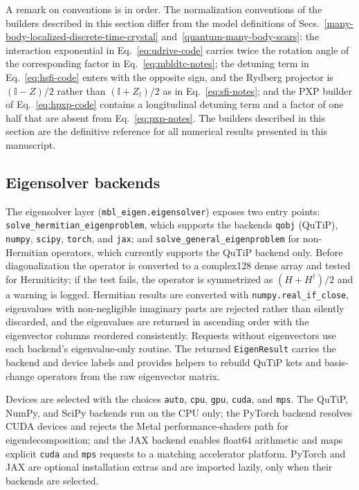 \documentclass[longbibliography]{revtex4-2}
\begin{document}
A remark on conventions is in order. The normalization conventions of
the builders described in this section differ from the model definitions
of Secs.~\ref{many-body-localized-discrete-time-crystal}
and~\ref{quantum-many-body-scars}: the interaction exponential in
Eq.~\eqref{eq:udrive-code} carries twice the rotation angle of the
corresponding factor in Eq.~\eqref{eq:mbldtc-notes}; the detuning term
in Eq.~\eqref{eq:hsfi-code} enters with the opposite sign, and the
Rydberg projector is $(\mathbb{I} - Z)/2$ rather than
$(\mathbb{I} + Z_l)/2$ as in Eq.~\eqref{eq:sfi-notes}; and the PXP
builder of Eq.~\eqref{eq:hpxp-code} contains a longitudinal detuning
term and a factor of one half that are absent from
Eq.~\eqref{eq:pxp-notes}. The builders described in this section are the
definitive reference for all numerical results presented in this
manuscript.

\subsection{Eigensolver backends}\label{subsec:eigensolver}

The eigensolver layer (\texttt{mbl\_eigen.eigensolver}) exposes two
entry points: \texttt{solve\_hermitian\_eigenproblem}, which supports
the backends \texttt{qobj} (QuTiP), \texttt{numpy}, \texttt{scipy},
\texttt{torch}, and \texttt{jax}; and
\texttt{solve\_general\_eigenproblem} for non-Hermitian operators,
which currently supports the QuTiP backend only. Before diagonalization
the operator is converted to a complex128 dense array and tested for
Hermiticity; if the test fails, the operator is symmetrized as
$(H + H^{\dagger})/2$ and a warning is logged. Hermitian results are
converted with \texttt{numpy.real\_if\_close}, eigenvalues with
non-negligible imaginary parts are rejected rather than silently
discarded, and the eigenvalues are returned in ascending order with the
eigenvector columns reordered consistently. Requests without
eigenvectors use each backend's eigenvalue-only routine. The returned
\texttt{EigenResult} carries the backend and device labels and provides
helpers to rebuild QuTiP kets and basis-change operators from the raw
eigenvector matrix.

Devices are selected with the choices \texttt{auto}, \texttt{cpu},
\texttt{gpu}, \texttt{cuda}, and \texttt{mps}. The QuTiP, NumPy, and
SciPy backends run on the CPU only; the PyTorch backend resolves CUDA
devices and rejects the Metal performance-shaders path for
eigendecomposition; and the JAX backend enables float64 arithmetic and
maps explicit \texttt{cuda} and \texttt{mps} requests to a matching
accelerator platform. PyTorch and JAX are optional installation extras
and are imported lazily, only when their backends are selected.
\end{document}
